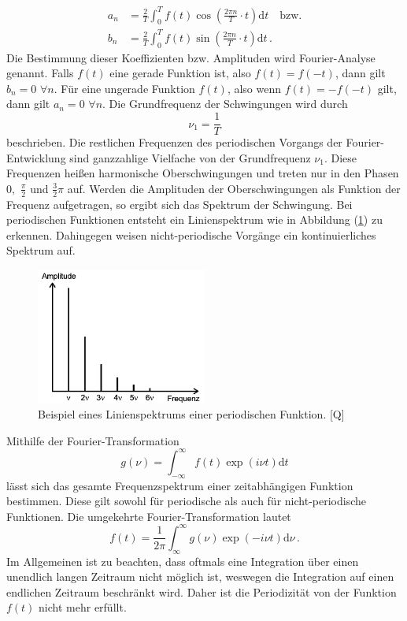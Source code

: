 \begin{align}
    a_n &= \frac{2}{T} \int_{0}^{T}f(t)\cos \left( \frac{2\pi n}{T}\cdot t\right)\text{d}t\quad \text{bzw.} \label{eqn:a_n}\\
    b_n &= \frac{2}{T} \int_{0}^{T}f(t)\sin \left( \frac{2\pi n}{T}\cdot t\right)\text{d}t\,.\label{eqn:b_n}
\end{align}
Die Bestimmung dieser Koeffizienten bzw. Amplituden wird Fourier-Analyse genannt. Falls $f(t)$ eine gerade Funktion ist, also $f(t)=f(-t)$, dann 
gilt $b_n = 0\,\,\forall n$. Für eine ungerade Funktion $f(t)$, also wenn $f(t) = -f(-t)$ gilt, dann gilt $a_n= 0\,\,\forall n$.
Die Grundfrequenz der Schwingungen wird durch
\begin{equation}
    \nu_1=\frac{1}{T}
    \label{eqn:Grundfrequenz}
\end{equation}
beschrieben. Die restlichen Frequenzen des periodischen Vorgangs der Fourier-Entwicklung sind ganzzahlige Vielfache von
der Grundfrequenz $\nu_1$. Diese Frequenzen heißen harmonische Oberschwingungen und treten nur in den Phasen $0,\,\, \frac{\pi}{2}$ und $\frac{3}{2}\pi$
auf. Werden die Amplituden der Oberschwingungen als Funktion der Frequenz aufgetragen, so ergibt sich das Spektrum der Schwingung. Bei periodischen
Funktionen entsteht ein Linienspektrum wie in Abbildung (\ref{fig:Linienspektrum}) zu erkennen. Dahingegen weisen nicht-periodische Vorgänge ein
kontinuierliches Spektrum auf.
\begin{figure}[H]
    \centering
    \includegraphics[width=0.50\textwidth]{Linienspektrum.png}
    \caption{Beispiel eines Linienspektrums einer periodischen Funktion. [Q\cite{anleitungV351}]}
    \label{fig:Linienspektrum}
\end{figure}
Mithilfe der Fourier-Transformation
\begin{equation}
    g(\nu)= \int_{-\infty}^{\infty}f(t)\exp\left(i \nu t\right) \text{d}t
    \label{eqn:FourierTransformation}
\end{equation}
lässt sich das gesamte Frequenzspektrum einer zeitabhängigen Funktion bestimmen. Diese gilt sowohl für periodische als auch für 
nicht-periodische Funktionen. Die umgekehrte Fourier-Transformation lautet
\begin{equation}
    f(t)=\frac{1}{2\pi}\int_{\infty}^{\infty}g(\nu)\exp\left(-i\nu t\right)\text{d}\nu\,.
    \label{eqn:reverseFourierTransformation}
\end{equation}
Im Allgemeinen ist zu beachten, dass oftmals eine Integration über einen unendlich langen Zeitraum nicht möglich ist, weswegen die Integration auf einen endlichen
Zeitraum beschränkt wird. Daher ist die Periodizität von der Funktion $f(t)$ nicht mehr erfüllt.
